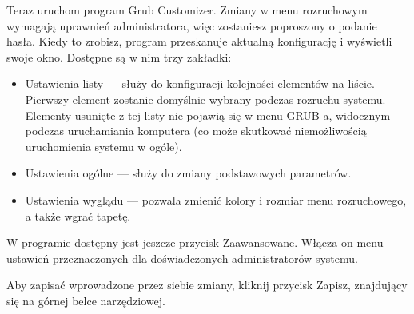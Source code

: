 Teraz uruchom program Grub Customizer. Zmiany w menu rozruchowym wymagają uprawnień administratora, więc zostaniesz poproszony o podanie hasła. Kiedy to zrobisz, program przeskanuje aktualną konfigurację i wyświetli swoje okno. Dostępne są w nim trzy zakładki:
\begin{itemize}
\item \textcolor{ubuntu_orange}{Ustawienia listy} --- służy do konfiguracji kolejności elementów na liście. Pierwszy element zostanie domyślnie wybrany podczas rozruchu systemu. Elementy usunięte z tej listy nie pojawią się w menu GRUB-a, widocznym podczas uruchamiania komputera (co może skutkować niemożliwością uruchomienia systemu w ogóle).
\item \textcolor{ubuntu_orange}{Ustawienia ogólne} --- służy do zmiany podstawowych parametrów.
\item \textcolor{ubuntu_orange}{Ustawienia wyglądu} --- pozwala zmienić kolory i rozmiar menu rozruchowego, a także wgrać tapetę.
\end{itemize}

W programie dostępny jest jeszcze przycisk \textcolor{ubuntu_orange}{Zaawansowane}. Włącza on menu ustawień przeznaczonych dla doświadczonych administratorów systemu.

Aby zapisać wprowadzone przez siebie zmiany, kliknij przycisk \textcolor{ubuntu_orange}{Zapisz}, znajdujący się na górnej belce narzędziowej.
\clearpage